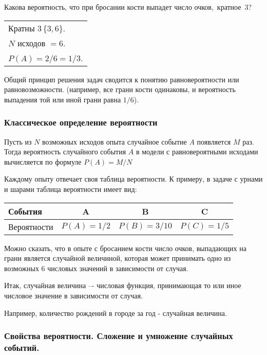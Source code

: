 \documentclass[a4paper,12pt]{report}
\begin{document}
	 Какова вероятность, что при бросании кости выпадет число очков,~кратное~3?

	\strut


	\begin{tabular}{l}

	Кратны $3\,\{3,6\}$.\\ 

	$N$ исходов $ = 6$.\\

	$P(A) = 2/6 = 1/3$.\\

	\end{tabular}


	\sstrut Общий принцип решения задач сводится к понятию равновероятности или равновозможности. (например, все грани кости одинаковы, и вероятность выпадения той или иной грани равна $1/6$).



\subsubsection{Классическое определение вероятности}

	Пусть из $N$ возможных исходов опыта случайное событие $A$ появляется $M$ раз. Тогда вероятность случайного события $A$ в модели с равновероятными исходами вычисляется по формуле $P(A) = M/N$ 

	Каждому опыту отвечает своя таблица вероятности. К примеру, в задаче с урнами и шарами таблица вероятности имеет вид: \strut


	\begin{tabular}{|l|c|c|c|}
	\hline
		События & A & B & C\\
	\hline	
		Вероятности & $P(A) = 1/2$ & $P(B) = 3/10$ & $P(C) = 1/5$\\
	\hline
	\end{tabular}


	\strut Можно сказать, что в опыте с бросанием кости число очков, выпадающих на грани является случайной величиной, которая может принимать одно из возможных 6 числовых значений в зависимости от случая.

	Итак, случайная величина –- числовая функция, принимающая то или иное числовое значение в зависимости от случая.

	Например, количество рождений в городе за год - случайная величина.





\subsubsection{Свойства вероятности. Сложение и умножение случайных событий.}
\end{document}
